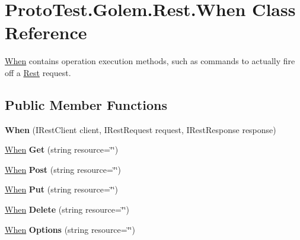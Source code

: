 \hypertarget{class_proto_test_1_1_golem_1_1_rest_1_1_when}{\section{Proto\-Test.\-Golem.\-Rest.\-When Class Reference}
\label{class_proto_test_1_1_golem_1_1_rest_1_1_when}
}


\hyperlink{class_proto_test_1_1_golem_1_1_rest_1_1_when}{When} contains operation execution methods, such as commands to actually fire off a \hyperlink{namespace_proto_test_1_1_golem_1_1_rest}{Rest} request.  


\subsection*{Public Member Functions}
\begin{DoxyCompactItemize}
\item 
\hypertarget{class_proto_test_1_1_golem_1_1_rest_1_1_when_a22cb38fdce6995741241a60a40923380}{{\bfseries When} (I\-Rest\-Client client, I\-Rest\-Request request, I\-Rest\-Response response)}\label{class_proto_test_1_1_golem_1_1_rest_1_1_when_a22cb38fdce6995741241a60a40923380}

\item 
\hypertarget{class_proto_test_1_1_golem_1_1_rest_1_1_when_a335e9f97d3d88f6cf13720a1cff74cfa}{\hyperlink{class_proto_test_1_1_golem_1_1_rest_1_1_when}{When} {\bfseries Get} (string resource=\char`\"{}\char`\"{})}\label{class_proto_test_1_1_golem_1_1_rest_1_1_when_a335e9f97d3d88f6cf13720a1cff74cfa}

\item 
\hypertarget{class_proto_test_1_1_golem_1_1_rest_1_1_when_a2723f65fc412168de11a5feaa3554a22}{\hyperlink{class_proto_test_1_1_golem_1_1_rest_1_1_when}{When} {\bfseries Post} (string resource=\char`\"{}\char`\"{})}\label{class_proto_test_1_1_golem_1_1_rest_1_1_when_a2723f65fc412168de11a5feaa3554a22}

\item 
\hypertarget{class_proto_test_1_1_golem_1_1_rest_1_1_when_ad2a8dd493504b716ea0feaeb9d6c98e2}{\hyperlink{class_proto_test_1_1_golem_1_1_rest_1_1_when}{When} {\bfseries Put} (string resource=\char`\"{}\char`\"{})}\label{class_proto_test_1_1_golem_1_1_rest_1_1_when_ad2a8dd493504b716ea0feaeb9d6c98e2}

\item 
\hypertarget{class_proto_test_1_1_golem_1_1_rest_1_1_when_ad80b65030e7b6d906a73c3effacc5768}{\hyperlink{class_proto_test_1_1_golem_1_1_rest_1_1_when}{When} {\bfseries Delete} (string resource=\char`\"{}\char`\"{})}\label{class_proto_test_1_1_golem_1_1_rest_1_1_when_ad80b65030e7b6d906a73c3effacc5768}

\item 
\hypertarget{class_proto_test_1_1_golem_1_1_rest_1_1_when_ab16ddd39348d526e2592edc1b64cb90c}{\hyperlink{class_proto_test_1_1_golem_1_1_rest_1_1_when}{When} {\bfseries Options} (string resource=\char`\"{}\char`\"{})}\label{class_proto_test_1_1_golem_1_1_rest_1_1_when_ab16ddd39348d526e2592edc1b64cb90c}

\end{DoxyCompactItemize}
